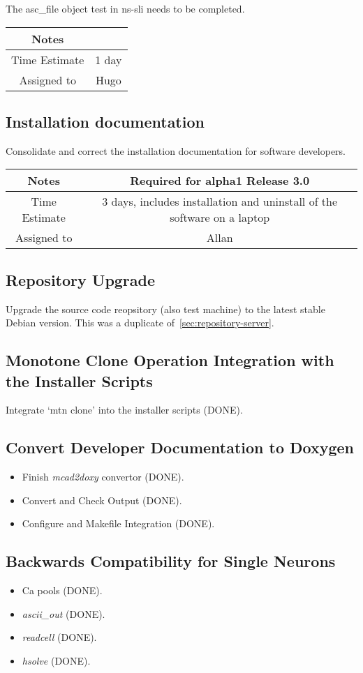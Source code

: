 \documentclass[12pt]{article}
\begin{document}
The asc\_file object test in ns-sli needs to be completed.

{
  \vspace{5mm}
  \centering
  \begin{tabular}{|c|c|}
    \hline
    Notes
    & \\
    \hline
    Time Estimate
    & 1 day \\
    \hline
    Assigned to
    & Hugo \\
    \hline
  \end{tabular}
}


\subsection{Installation documentation}

Consolidate and correct the installation documentation for software
developers.

{
  \vspace{5mm}
  \centering
  \begin{tabular}{|c|c|}
    \hline
    Notes
    & Required for alpha1 Release 3.0 \\
    \hline
    Time Estimate
    & 3 days, includes installation and uninstall of the software on a laptop \\
    \hline
    Assigned to
    & Allan \\
    \hline
  \end{tabular}
}


\subsection{Repository Upgrade}

Upgrade the source code reopsitory (also test machine) to the latest
stable Debian version.  This was a duplicate
of~\ref{sec:repository-server}.


\subsection{Monotone Clone Operation Integration with the Installer Scripts}
Integrate `mtn clone' into the installer scripts (DONE).

\subsection{Convert Developer Documentation to Doxygen}

\begin{itemize}
\item Finish {\it mcad2doxy} convertor (DONE).
\item Convert and Check Output (DONE).
\item Configure and Makefile Integration (DONE).
\end{itemize}

\subsection{Backwards Compatibility for Single Neurons}

\begin{itemize}
\item Ca pools (DONE).
\item {\it ascii\_out} (DONE).
\item {\it readcell} (DONE).
\item {\it hsolve} (DONE).
\end{itemize}
\end{document}
